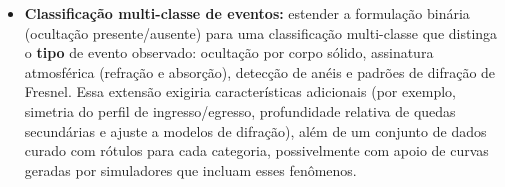 \begin{itemize}
	\item \textbf{Classificação multi-classe de eventos:} estender a formulação binária (ocultação presente/ausente) para uma classificação multi-classe que distinga o \textbf{tipo} de evento observado: ocultação por corpo sólido, assinatura atmosférica (refração e absorção), detecção de anéis e padrões de difração de Fresnel. Essa extensão exigiria características adicionais (por exemplo, simetria do perfil de ingresso/egresso, profundidade relativa de quedas secundárias e ajuste a modelos de difração), além de um conjunto de dados curado com rótulos para cada categoria, possivelmente com apoio de curvas geradas por simuladores que incluam esses fenômenos.
\end{itemize}
